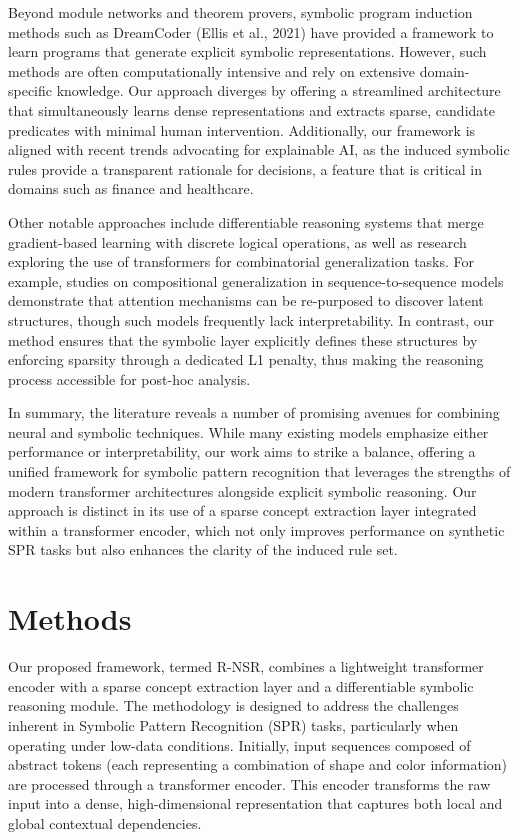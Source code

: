 \documentclass{article}
\begin{document}
Beyond module networks and theorem provers, symbolic program induction methods such as DreamCoder (Ellis et al., 2021) have provided a framework to learn programs that generate explicit symbolic representations. However, such methods are often computationally intensive and rely on extensive domain-specific knowledge. Our approach diverges by offering a streamlined architecture that simultaneously learns dense representations and extracts sparse, candidate predicates with minimal human intervention. Additionally, our framework is aligned with recent trends advocating for explainable AI, as the induced symbolic rules provide a transparent rationale for decisions, a feature that is critical in domains such as finance and healthcare.

Other notable approaches include differentiable reasoning systems that merge gradient-based learning with discrete logical operations, as well as research exploring the use of transformers for combinatorial generalization tasks. For example, studies on compositional generalization in sequence-to-sequence models demonstrate that attention mechanisms can be re-purposed to discover latent structures, though such models frequently lack interpretability. In contrast, our method ensures that the symbolic layer explicitly defines these structures by enforcing sparsity through a dedicated L1 penalty, thus making the reasoning process accessible for post-hoc analysis.

In summary, the literature reveals a number of promising avenues for combining neural and symbolic techniques. While many existing models emphasize either performance or interpretability, our work aims to strike a balance, offering a unified framework for symbolic pattern recognition that leverages the strengths of modern transformer architectures alongside explicit symbolic reasoning. Our approach is distinct in its use of a sparse concept extraction layer integrated within a transformer encoder, which not only improves performance on synthetic SPR tasks but also enhances the clarity of the induced rule set.

\section{Methods}
Our proposed framework, termed R-NSR, combines a lightweight transformer encoder with a sparse concept extraction layer and a differentiable symbolic reasoning module. The methodology is designed to address the challenges inherent in Symbolic Pattern Recognition (SPR) tasks, particularly when operating under low-data conditions. Initially, input sequences composed of abstract tokens (each representing a combination of shape and color information) are processed through a transformer encoder. This encoder transforms the raw input into a dense, high-dimensional representation that captures both local and global contextual dependencies.
\end{document}
